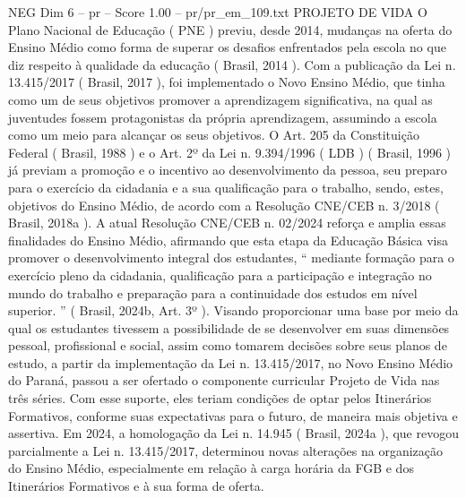 \begin{textsample}{NEG Dim 6 – pr – Score 1.00 – pr/pr\_em\_109.txt}  \label{ex:f6_neg_267}
PROJETO DE VIDA O Plano Nacional de Educação ( PNE ) previu, desde 2014, mudanças na oferta do Ensino Médio como forma de superar os desafios enfrentados pela escola no que diz respeito à qualidade da educação ( Brasil, 2014 ).
Com a publicação da Lei n. 13.415/2017 ( Brasil, 2017 ), foi implementado o Novo Ensino Médio, que tinha como um de seus objetivos promover a aprendizagem significativa, na qual as juventudes fossem protagonistas da própria aprendizagem, assumindo a escola como um meio para alcançar os seus objetivos.
O Art. 205 da Constituição Federal ( Brasil, 1988 ) e o Art. 2º da Lei n. 9.394/1996 ( LDB ) ( Brasil, 1996 ) já previam a promoção e o incentivo ao desenvolvimento da pessoa, seu preparo para o exercício da cidadania e a sua qualificação para o trabalho, sendo, estes, objetivos do Ensino Médio, de acordo com a Resolução CNE/CEB n. 3/2018 ( Brasil, 2018a ).
A atual Resolução CNE/CEB n. 02/2024 reforça e amplia essas finalidades do Ensino Médio, afirmando que esta etapa da Educação Básica visa promover o desenvolvimento integral dos estudantes, “ mediante formação para o exercício pleno da cidadania, qualificação para a participação e integração no mundo do trabalho e preparação para a continuidade dos estudos em nível superior. ” ( Brasil, 2024b, Art. 3º ).
Visando proporcionar uma base por meio da qual os estudantes tivessem a possibilidade de se desenvolver em suas dimensões pessoal, profissional e social, assim como tomarem decisões sobre seus planos de estudo, a partir da implementação da Lei n. 13.415/2017, no Novo Ensino Médio do Paraná, passou a ser ofertado o componente curricular Projeto de Vida nas três séries.
Com esse suporte, eles teriam condições de optar pelos Itinerários Formativos, conforme suas expectativas para o futuro, de maneira mais objetiva e assertiva.
Em 2024, a homologação da Lei n. 14.945 ( Brasil, 2024a ), que revogou parcialmente a Lei n. 13.415/2017, determinou novas alterações na organização do Ensino Médio, especialmente em relação à carga horária da FGB e dos Itinerários Formativos e à sua forma de oferta.

\end{textsample}
